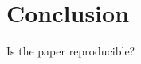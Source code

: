 \documentclass[11pt,a4paper]{article}
\begin{document}
\section{Conclusion}
Is the paper reproducible?



\end{document}
